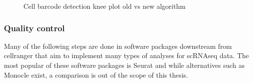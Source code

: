 \begin{figure}[htbp!]
\caption{Cell barcode detection knee plot old vs new algorithm}
\label{figure:knee}
\begin{centering}
\end{centering}

\end{figure}

\subsubsection{Quality control}

\par{
Many of the following steps are done in software packages downstream from cellranger that aim to implement many types of analyses for scRNAseq data. The most popular of these software packages is Seurat\cite{seurat1}\cite{seurat2} and while alternatives such as Monocle\cite{monocle} exist, a comparison is out of the scope of this thesis.
} 

